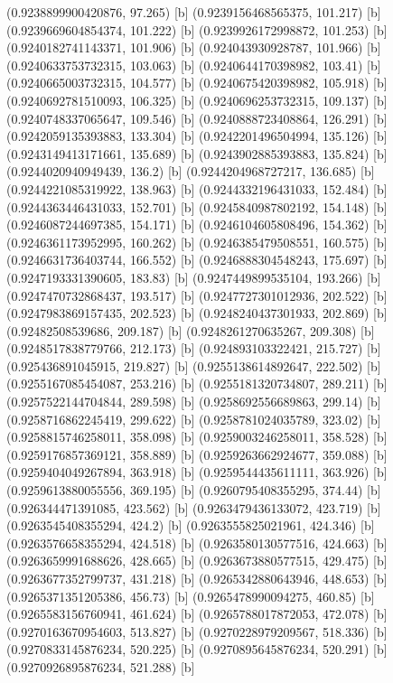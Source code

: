{{{(0.9238899900420876, 97.265) [b] 
(0.9239156468565375, 101.217) [b] 
(0.9239669604854374, 101.222) [b] 
(0.9239926172998872, 101.253) [b] 
(0.9240182741143371, 101.906) [b] 
(0.924043930928787, 101.966) [b] 
(0.9240633753732315, 103.063) [b] 
(0.9240644170398982, 103.41) [b] 
(0.9240665003732315, 104.577) [b] 
(0.9240675420398982, 105.918) [b] 
(0.9240692781510093, 106.325) [b] 
(0.9240696253732315, 109.137) [b] 
(0.9240748337065647, 109.546) [b] 
(0.9240888723408864, 126.291) [b] 
(0.9242059135393883, 133.304) [b] 
(0.9242201496504994, 135.126) [b] 
(0.9243149413171661, 135.689) [b] 
(0.9243902885393883, 135.824) [b] 
(0.9244020940949439, 136.2) [b] 
(0.9244204968727217, 136.685) [b] 
(0.9244221085319922, 138.963) [b] 
(0.9244332196431033, 152.484) [b] 
(0.9244363446431033, 152.701) [b] 
(0.9245840987802192, 154.148) [b] 
(0.9246087244697385, 154.171) [b] 
(0.9246104605808496, 154.362) [b] 
(0.9246361173952995, 160.262) [b] 
(0.9246385479508551, 160.575) [b] 
(0.9246631736403744, 166.552) [b] 
(0.9246888304548243, 175.697) [b] 
(0.9247193331390605, 183.83) [b] 
(0.9247449899535104, 193.266) [b] 
(0.9247470732868437, 193.517) [b] 
(0.9247727301012936, 202.522) [b] 
(0.9247983869157435, 202.523) [b] 
(0.9248240437301933, 202.869) [b] 
(0.92482508539686, 209.187) [b] 
(0.9248261270635267, 209.308) [b] 
(0.9248517838779766, 212.173) [b] 
(0.924893103322421, 215.727) [b] 
(0.925436891045915, 219.827) [b] 
(0.9255138614892647, 222.502) [b] 
(0.9255167085454087, 253.216) [b] 
(0.9255181320734807, 289.211) [b] 
(0.9257522144704844, 289.598) [b] 
(0.9258692556689863, 299.14) [b] 
(0.9258716862245419, 299.622) [b] 
(0.9258781024035789, 323.02) [b] 
(0.9258815746258011, 358.098) [b] 
(0.9259003246258011, 358.528) [b] 
(0.9259176857369121, 358.889) [b] 
(0.9259263662924677, 359.088) [b] 
(0.9259404049267894, 363.918) [b] 
(0.9259544435611111, 363.926) [b] 
(0.9259613880055556, 369.195) [b] 
(0.9260795408355295, 374.44) [b] 
(0.926344471391085, 423.562) [b] 
(0.9263479436133072, 423.719) [b] 
(0.9263545408355294, 424.2) [b] 
(0.9263555825021961, 424.346) [b] 
(0.9263576658355294, 424.518) [b] 
(0.9263580130577516, 424.663) [b] 
(0.9263659991688626, 428.665) [b] 
(0.9263673880577515, 429.475) [b] 
(0.9263677352799737, 431.218) [b] 
(0.9265342880643946, 448.653) [b] 
(0.9265371351205386, 456.73) [b] 
(0.9265478990094275, 460.85) [b] 
(0.9265583156760941, 461.624) [b] 
(0.9265788017872053, 472.078) [b] 
(0.9270163670954603, 513.827) [b] 
(0.9270228979209567, 518.336) [b] 
(0.9270833145876234, 520.225) [b] 
(0.9270895645876234, 520.291) [b] 
(0.9270926895876234, 521.288) [b] 
}}}
